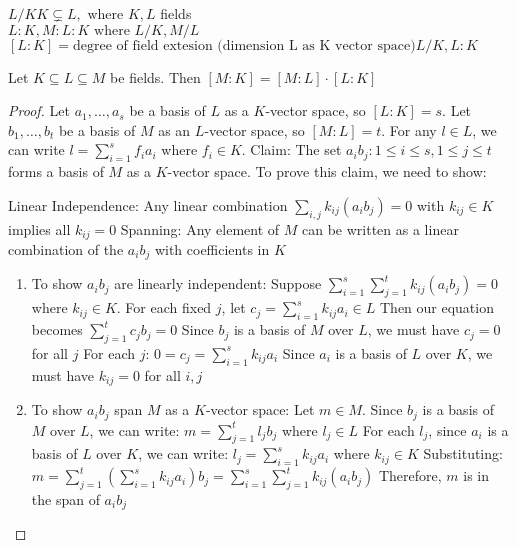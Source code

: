 \documentclass{article}
\begin{document}
$L/K K\subsetneq L, \text{ where }K, L$ fields \\ 
$L:K, M:L:K \text{ where } L /K, M / L$  \\ 
$ [L:K] = \text{degree of field extesion (dimension L as K vector space)}  L /K, L: K$ \\ 
\begin{theorem}
    Let $K \subseteq L \subseteq M$ be fields. Then
    $[M:K] = [M:L] \cdot [L:K]$
    \end{theorem}
    \begin{proof}
    Let ${a_1, \dots, a_s}$ be a basis of $L$ as a $K$-vector space, so $[L:K] = s$.
    Let ${b_1, \dots, b_t}$ be a basis of $M$ as an $L$-vector space, so $[M:L] = t$.
    For any $l \in L$, we can write $l = \sum_{i=1}^s f_i a_i$ where $f_i \in K$.
    Claim: The set ${a_ib_j : 1 \leq i \leq s, 1 \leq j \leq t}$ forms a basis of $M$ as a $K$-vector space.
    To prove this claim, we need to show:
    
    Linear Independence: Any linear combination $\sum_{i,j} k_{ij}(a_ib_j) = 0$ with $k_{ij} \in K$ implies all $k_{ij} = 0$
    Spanning: Any element of $M$ can be written as a linear combination of the $a_ib_j$ with coefficients in $K$
    
    
    \begin{enumerate}
        \item To show ${a_ib_j}$ are linearly independent:
        Suppose $\sum_{i=1}^s \sum_{j=1}^t k_{ij}(a_ib_j) = 0$ where $k_{ij} \in K$.
        For each fixed $j$, let $c_j = \sum_{i=1}^s k_{ij}a_i \in L$
        Then our equation becomes $\sum_{j=1}^t c_jb_j = 0$
        Since ${b_j}$ is a basis of $M$ over $L$, we must have $c_j = 0$ for all $j$
        For each $j$: $0 = c_j = \sum_{i=1}^s k_{ij}a_i$
        Since ${a_i}$ is a basis of $L$ over $K$, we must have $k_{ij} = 0$ for all $i,j$
        \item To show ${a_ib_j}$ span $M$ as a $K$-vector space:
        Let $m \in M$. Since ${b_j}$ is a basis of $M$ over $L$, we can write:
        $m = \sum_{j=1}^t l_jb_j$ where $l_j \in L$
        For each $l_j$, since ${a_i}$ is a basis of $L$ over $K$, we can write:
        $l_j = \sum_{i=1}^s k_{ij}a_i$ where $k_{ij} \in K$
        Substituting:
        $m = \sum_{j=1}^t (\sum_{i=1}^s k_{ij}a_i)b_j = \sum_{i=1}^s \sum_{j=1}^t k_{ij}(a_ib_j)$
        Therefore, $m$ is in the span of ${a_ib_j}$
        \end{enumerate}
    \end{proof}


 
\end{document}
